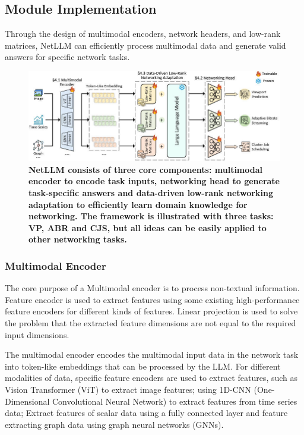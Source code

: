 \documentclass[twocolumn]{article}
\begin{document}
\subsection{Module Implementation}
Through the design of multimodal encoders, network headers, and low-rank matrices, NetLLM can efficiently process multimodal data and generate valid answers for specific network tasks.

\begin{figure}[t]
  \centering
  \includegraphics[width=1\linewidth]{img/figure8.jpg}
  \caption{\textbf{NetLLM consists of three core components: multimodal encoder to encode task inputs, networking head to generate task-specific answers and data-driven low-rank networking adaptation to efficiently learn domain knowledge for networking. The framework is illustrated with three tasks: VP, ABR and CJS, but all ideas can be easily applied to other networking tasks.}}
  \label{fig:7}
\end{figure}

\subsubsection{Multimodal Encoder}
The core purpose of a Multimodal encoder is to process non-textual information. Feature encoder is used to extract features using some existing high-performance feature encoders for different kinds of features. Linear projection is used to solve the problem that the extracted feature dimensions are not equal to the required input dimensions. 

The multimodal encoder encodes the multimodal input data in the network task into token-like embeddings that can be processed by the LLM. For different modalities of data, specific feature encoders are used to extract features, such as Vision Transformer (ViT) to extract image features; using 1D-CNN (One-Dimensional Convolutional Neural Network) to extract features from time series data; Extract features of scalar data using a fully connected layer and feature extracting graph data using graph neural networks (GNNs).
\end{document}
